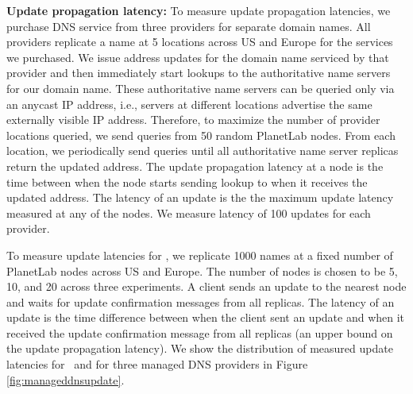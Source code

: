 \textbf{Update propagation latency:} To measure update propagation latencies, we purchase DNS service from three providers for separate domain names.  All providers replicate a name at 5 locations across US and Europe for the services we purchased. We issue address updates for the domain name serviced by that provider and then immediately start lookups to the authoritative name servers for our domain name.
These authoritative name servers can be queried only via an anycast IP address, i.e., servers at different locations advertise the same externally visible IP address. Therefore, to maximize the number of provider locations queried, we send queries from 50 random PlanetLab nodes. From each location, we periodically send queries until all authoritative name server replicas return the updated address.  The update propagation latency at a node is the time between when the node starts sending lookup to when it receives the updated address. The latency of an update is the the maximum update latency measured at any of the nodes. We measure latency of 100 updates for each provider.

To measure update latencies for \auspice, we replicate 1000 names at a fixed number of PlanetLab nodes across US and Europe. The number of nodes is chosen to be 5, 10, and 20 across three experiments. A client sends an update to the nearest node and waits for update confirmation messages from all replicas. The latency of an update is the time difference between when the client sent an update and when it received the update confirmation message from all replicas (an upper bound on the update propagation latency).  We show the distribution of measured update latencies for \auspice\ and for three managed DNS providers in Figure \ref{fig:manageddnsupdate}.   





